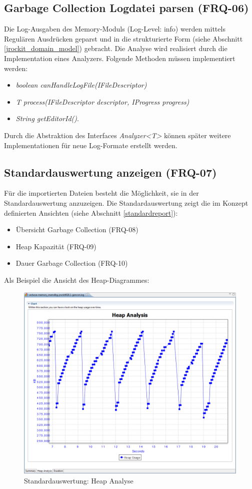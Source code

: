 \subsection{Garbage Collection Logdatei parsen (FRQ-06)}
Die Log-Ausgaben des Memory-Moduls (Log-Level: info) werden mittels Regulären Ausdrücken geparst und in die strukturierte Form (siehe Abschnitt \ref{jrockit_domain_model}) gebracht. Die Analyse wird realisiert durch die Implementation eines Analyzers. Folgende Methoden müssen implementiert werden:
\begin{itemize}
\item \textit{boolean canHandleLogFile(IFileDescriptor)}
\item \textit{T process(IFileDescriptor descriptor, IProgress progress)}
\item \textit{String getEditorId()}.
\end{itemize}
Durch die Abstraktion des Interfaces \textit{Analyzer\textless T\textgreater} können später weitere Implementationen für neue Log-Formate erstellt werden.

\subsection{Standardauswertung anzeigen (FRQ-07)}
Für die importierten Dateien besteht die Möglichkeit, sie in der Standardauswertung anzuzeigen. Die Standardauswertung zeigt die im Konzept definierten Ansichten (siehe Abschnitt \ref{standardreport}):
\begin{itemize}
\item Übersicht Garbage Collection (FRQ-08)
\item Heap Kapazität (FRQ-09)
\item Dauer Garbage Collection (FRQ-10)
\end{itemize}


Als Beispiel die Ansicht des Heap-Diagrammes:
 \begin{figure}[H]
  	\centering
    	\includegraphics[width=15cm]{images/tutorial_standardreport_heapanalysis}
        	\caption{Standardauswertung: Heap Analyse}
\end{figure}

